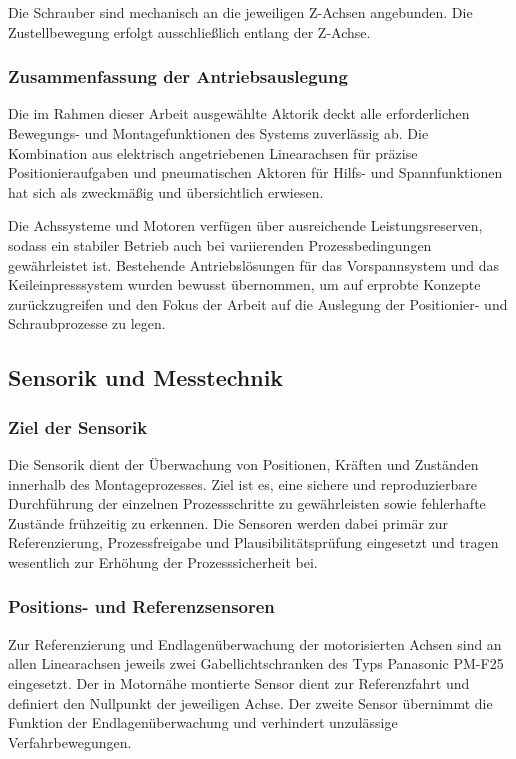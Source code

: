 Die Schrauber sind mechanisch an die jeweiligen Z-Achsen angebunden. Die Zustellbewegung erfolgt ausschließlich entlang der Z-Achse.

\subsubsection{Zusammenfassung der Antriebsauslegung}
Die im Rahmen dieser Arbeit ausgewählte Aktorik deckt alle erforderlichen Bewegungs- und Montagefunktionen des Systems zuverlässig ab. Die Kombination aus elektrisch angetriebenen Linearachsen für präzise Positionieraufgaben und pneumatischen Aktoren für Hilfs- und Spannfunktionen hat sich als zweckmäßig und übersichtlich erwiesen.

Die Achssysteme und Motoren verfügen über ausreichende Leistungsreserven, sodass ein stabiler Betrieb auch bei variierenden Prozessbedingungen gewährleistet ist. Bestehende Antriebslösungen für das Vorspannsystem und das Keileinpresssystem wurden bewusst übernommen, um auf erprobte Konzepte zurückzugreifen und den Fokus der Arbeit auf die Auslegung der Positionier- und Schraubprozesse zu legen.

\subsection{Sensorik und Messtechnik}
\label{sec:sensorik_messtechnik}

\subsubsection{Ziel der Sensorik}
Die Sensorik dient der Überwachung von Positionen, Kräften und Zuständen innerhalb des Montageprozesses. Ziel ist es, eine sichere und reproduzierbare Durchführung der einzelnen Prozessschritte zu gewährleisten sowie fehlerhafte Zustände frühzeitig zu erkennen. Die Sensoren werden dabei primär zur Referenzierung, Prozessfreigabe und Plausibilitätsprüfung eingesetzt und tragen wesentlich zur Erhöhung der Prozesssicherheit bei.

\subsubsection{Positions- und Referenzsensoren}
Zur Referenzierung und Endlagenüberwachung der motorisierten Achsen sind an allen Linearachsen jeweils zwei Gabellichtschranken des Typs Panasonic PM-F25 eingesetzt. Der in Motornähe montierte Sensor dient zur Referenzfahrt und definiert den Nullpunkt der jeweiligen Achse. Der zweite Sensor übernimmt die Funktion der Endlagenüberwachung und verhindert unzulässige Verfahrbewegungen.\cite{ds_panasonic_pmf25}

